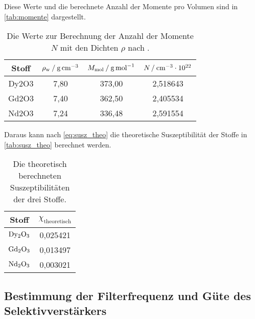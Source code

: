 Diese Werte und die berechnete Anzahl der Momente pro Volumen sind in \autoref{tab:momente} dargestellt.
\begin{table}
  \centering
  \caption{Die Werte zur Berechnung der Anzahl der Momente $N$ mit den Dichten $\rho$ nach \cite{v606}.}
  \label{tab:momente}
  \begin{tabular}{c c c c}
    \toprule
    Stoff &     
    $\rho_\text{w} \mathbin{/} \unit[per-mode=reciprocal]{\gram\per\cubic\centi\meter}$ & 
    $M_\text{mol} \mathbin{/} \unit[per-mode=reciprocal]{\gram\per\mol}$ & 
    $N \mathbin{/} \unit[per-mode=reciprocal]{\per\cubic\centi\meter} \cdot 10^{22}$ \\ 
    \midrule
    Dy2O3 &         7,80 &       373,00 &            2,518643 \\
    Gd2O3 &         7,40 &       362,50 &            2,405534 \\
    Nd2O3 &         7,24 &       336,48 &            2,591554 \\
    \bottomrule
    \end{tabular}
\end{table}

Daraus kann nach \autoref{eq:susz_theo} die theoretische Suszeptibilität der Stoffe in \autoref{tab:susz_theo} berechnet werden.
\begin{table}
  \centering
  \caption{Die theoretisch berechneten Suszeptibilitäten der drei Stoffe.}
  \label{tab:susz_theo}
  \begin{tabular}{ c c}
    \toprule
    Stoff & 
    $\chi_\text{theoretisch}$ \\
    \midrule
    $\ce{Dy2O3}$ &  0,025421 \\
    $\ce{Gd2O3}$ &  0,013497 \\
    $\ce{Nd2O3}$ &  0,003021 \\
    \bottomrule
  \end{tabular}
\end{table}


\subsection{Bestimmung der Filterfrequenz und Güte des Selektivverstärkers}

